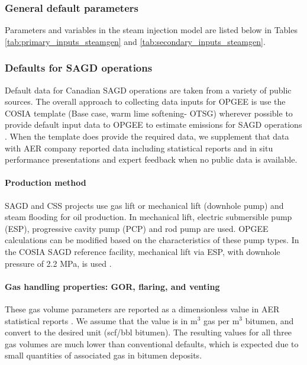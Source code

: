 \documentclass[11pt]{report}
\begin{document}
\subsubsection{General default parameters}

Parameters and variables in the steam injection model are listed below in Tables \ref{tab:primary_inputs_steamgen} and \ref{tab:secondary_inputs_steamgen}.


\subsubsection{Defaults for SAGD operations}

Default data for Canadian SAGD operations are taken from a variety of public sources.  The overall approach to collecting data inputs for OPGEE is use the COSIA template (Base case, warm lime softening- OTSG) \cite{COSIA2014} wherever possible to provide default input data to OPGEE to estimate emissions for SAGD operations \cite{COSIA2014}. When the template does provide the required data, we supplement that data with AER company reported data including statistical reports \cite{AERvar} and in situ performance presentations \cite{AERvarISPP} and expert feedback when no public data is available.

\paragraph{Production method}
SAGD and CSS projects use gas lift or mechanical lift (downhole pump) and steam flooding for oil production. In mechanical lift, electric submersible pump (ESP), progressive cavity pump (PCP) and rod pump are used. OPGEE calculations can be modified based on the characteristics of these pump types.
In the COSIA SAGD reference facility, mechanical lift via ESP, with downhole pressure of 2.2 MPa, is used \cite{COSIA2014}.

\paragraph{Gas handling properties: GOR, flaring, and venting}
These gas volume parameters are reported as a dimensionless value in AER statistical reports \cite{AERvar}. We assume that the value is in m$^3$ gas per m$^3$ bitumen, and convert to the desired unit (scf/bbl bitumen). The resulting values for all three gas volumes are much lower than conventional defaults, which is expected due to small quantities of associated gas in bitumen deposits.
\end{document}
